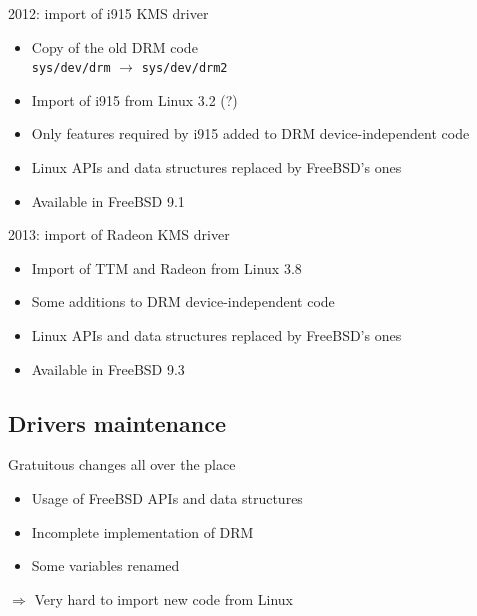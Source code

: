\documentclass{beamer}
\begin{document}
\begin{frame}{2012: import of i915 KMS driver}
  \begin{itemize}
    \item Copy of the old DRM code \\
      \texttt{sys/dev/drm} $\rightarrow$ \texttt{sys/dev/drm2}
    \item Import of i915 from Linux 3.2 (?)
    \item Only features required by i915 added to DRM device-independent code
    \item Linux APIs and data structures replaced by FreeBSD's ones
    \item Available in FreeBSD 9.1
  \end{itemize}
\end{frame}

\begin{frame}{2013: import of Radeon KMS driver}
  \begin{itemize}
    \item Import of TTM and Radeon from Linux 3.8
    \item Some additions to DRM device-independent code
    \item Linux APIs and data structures replaced by FreeBSD's ones
    \item Available in FreeBSD 9.3
  \end{itemize}
\end{frame}

\subsection{Drivers maintenance}

\begin{frame}{Gratuitous changes all over the place}
  \begin{itemize}
    \item Usage of FreeBSD APIs and data structures
    \item Incomplete implementation of DRM
    \item Some variables renamed
  \end{itemize}
  $\Rightarrow$ Very hard to import new code from Linux
\end{frame}
\end{document}
